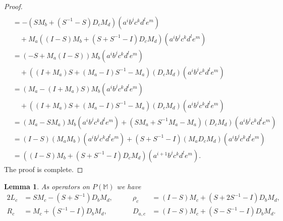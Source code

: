 \documentclass{amsart}
\theoremstyle{plain}
\newtheorem{lemma}{Lemma}[section]
\theoremstyle{definition}
\begin{document}
\begin{proof}
\begin{align*}
  \\
  &=
  -
  ( S M_b + ( S^{-1} - S ) D_c M_d )
  ( a^i b^j c^k d^l e^m )
  \\
  &\quad
  +
  M_a ( ( I - S ) M_b + ( S + S^{-1} - I ) D_c M_d )
  ( a^i b^j c^k d^l e^m )
  \\
  &=
  ( - S + M_a (I - S ) ) M_b
  ( a^i b^jc^k d^l e^m )
  \\
  &\quad
  +
  ( ( I + M_a ) S + ( M_a - I ) S^{-1} - M_a ) ( D_c M_d )
  ( a^i b^j c^k d^l e^m )
  \\
  &=
  ( M_a - (I + M_a) S ) M_b
  ( a^i b^jc^k d^l e^m )
  \\
  &\quad
  +
  ( ( I + M_a ) S + ( M_a - I ) S^{-1} - M_a ) ( D_c M_d )
  ( a^i b^j c^k d^l e^m )
  \\
  &=
  ( M_a - S M_a ) M_b
  ( a^i b^jc^k d^l e^m )
  +
  ( S M_a + S^{-1} M_a - M_a ) ( D_c M_d )
  ( a^i b^j c^k d^l e^m )
  \\
  &=
  ( I - S ) ( M_a M_b )
  ( a^i b^j c^k d^l e^m )
  +
  ( S + S^{-1} - I ) ( M_a D_c M_d )
  ( a^i b^j c^k d^l e^m )
  \\
  &=
  ( ( I - S ) M_b + ( S + S^{-1} - I ) D_c M_d )
  ( a^{i+1} b^j c^k d^l e^m ).
  \end{align*}
The proof is complete.
\end{proof}

\begin{lemma} \label{c-formulas}
As operators on $P(\mathbb{M})$ we have
  \allowdisplaybreaks
  \begin{alignat*}{2}
  L_c
  &=
  S M_c - ( S + S^{-1} ) D_b M_d,
  &\qquad
  \rho_c
  &=
  ( I - S ) M_c + ( S + 2 S^{-1} - I ) D_b M_d,
  \\
  R_c
  &=
  M_c + ( S^{-1} - I ) D_b M_d,
  &\qquad
  D_{a,c}
  &=
  ( I - S ) M_c + (  S - S^{-1} - I  ) D_b M_d.
  \end{alignat*}
\end{lemma}
\end{document}

